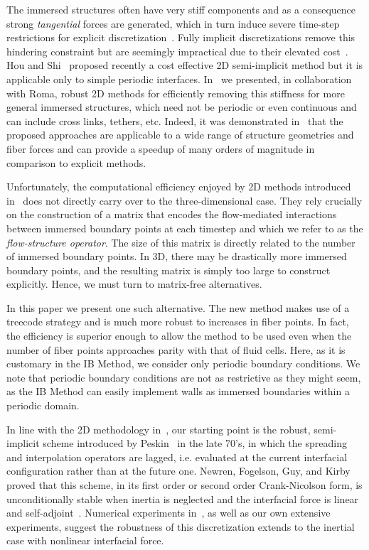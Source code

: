 \documentclass[preprint,12pt]{elsarticle}
\newcommand{\New}[1]{{\color{Red}#1}}
\begin{document}
The immersed structures often have very stiff components and as a consequence strong  {\em tangential} forces are generated,  which in turn   induce severe time-step restrictions for explicit discretization~\cite{SW95,SW99}.  Fully implicit discretizations remove this  hindering constraint but are seemingly impractical due to their elevated cost~\cite{TP92, MP93}. Hou and Shi~\cite{HS2008b,HS2008a} proposed recently a cost effective 2D semi-implicit method  but it is applicable only to simple periodic interfaces.
In~\cite{IBM_Implicit2D} we presented, in collaboration with Roma, robust 2D methods for efficiently removing this stiffness  for more general immersed structures, which need not be periodic or even continuous and can include cross links, tethers, etc. Indeed, it was demonstrated in~\cite{IBM_Implicit2D} that the proposed approaches  are applicable to a wide range of structure geometries and fiber forces and can provide a speedup of many orders of magnitude in comparison to explicit methods.

Unfortunately,  the computational efficiency enjoyed by  2D methods introduced in~\cite{IBM_Implicit2D} 
does not directly carry over to the three-dimensional case. They rely crucially on the construction of a matrix that encodes the flow-mediated  interactions between immersed boundary points at each timestep and which we refer to as the {\em flow-structure operator}. The size of this matrix is directly related to the number of immersed boundary points. In 3D,  there may be drastically more immersed boundary points, and the resulting matrix is simply too large to construct explicitly. Hence, we must turn to matrix-free alternatives.

In this paper we present one such alternative. The new method makes use of a treecode strategy and is much more robust to increases in fiber points. In fact, the efficiency is superior enough to allow the method to be used even when the number of fiber points approaches parity with that  of fluid cells. Here, as it is customary in the IB Method,  we consider only periodic boundary conditions.
\New{We note that periodic boundary conditions are not as restrictive as they might seem, as the IB Method can easily implement walls as immersed boundaries within a periodic domain.}  

In line with the 2D methodology in~\cite{IBM_Implicit2D}, our starting point is the robust, semi-implicit scheme introduced by Peskin~\cite{Peskin77} in the late 70's, in which
the spreading and interpolation operators are lagged, i.e. evaluated at the current interfacial configuration rather than at the future one. Newren, Fogelson, Guy, and Kirby
proved that this scheme, in its first order or second order Crank-Nicolson form, is unconditionally stable when inertia is neglected and the interfacial  force is linear and self-adjoint~\cite{NFGK2007}. Numerical experiments in~\cite{NFGK2007}, as well as our own extensive experiments, suggest the robustness of this discretization extends to the inertial case with nonlinear interfacial force.
\end{document}
